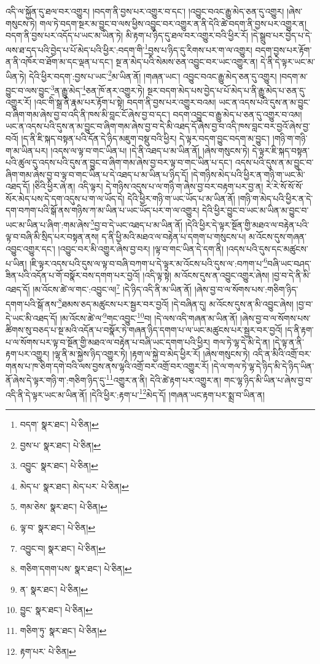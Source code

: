འདི་ལ་སྐྱོན་དུ་ཐལ་བར་འགྱུར། །བདག་ནི་བྱས་པར་འགྱུར་བ་དང་། །འབྱུང་བའང་རྒྱུ་མེད་ཅན་དུ་འགྱུར། །ཞེས་གསུངས་ཏེ། གལ་ཏེ་བདག་སྔར་མ་བྱུང་བ་ལས་ཕྱིས་འབྱུང་བར་འགྱུར་ན་ནི་དེའི་ཚེ་བདག་ནི་བྱས་པར་འགྱུར་ན། བདག་ནི་བྱས་པར་འདོད་པ་ཡང་མ་ཡིན་ཏེ། མི་རྟག་པ་ཉིད་དུ་ཐལ་བར་འགྱུར་བའི་ཕྱིར་རོ། །དེ་སྒྲུབ་པར་བྱེད་པ་དེ་ལས་ཐ་དད་པའི་བྱེད་པ་པོ་མེད་པའི་ཕྱིར་:བདག་གི་\footnote{བདག་  སྣར་ཐང་།  པེ་ཅིན། }བྱས་པ་ཉིད་དུ་རིགས་པར་ག་ལ་འགྱུར། བདག་བྱས་པར་རྟོག་ན་ནི་འཁོར་བ་ཐོག་མ་དང་ལྡན་པ་དང་། སྔ་ན་མེད་པའི་སེམས་ཅན་འབྱུང་བར་ཡང་འགྱུར་ན། དེ་ནི་དེ་ལྟར་ཡང་མ་ཡིན་ཏེ། དེའི་ཕྱིར་བདག་:བྱས་པ་ཡང་\footnote{བྱས་པ་  སྣར་ཐང་།  པེ་ཅིན། }མ་ཡིན་ནོ། །གཞན་ཡང་། འབྱུང་བའང་རྒྱུ་མེད་ཅན་དུ་འགྱུར། །བདག་མ་བྱུང་བ་ལས་བྱུང་\footnote{འབྱུང་  སྣར་ཐང་།  པེ་ཅིན། }ན་རྒྱུ་མེད་\footnote{མེད་པ་  སྣར་ཐང་། མེད་པར་  པེ་ཅིན། }ཅན་ཁོ་ནར་འགྱུར་ཏེ། སྔར་བདག་མེད་པས་བྱེད་པ་པོ་མེད་པ་ནི་རྒྱུ་མེད་པ་ཅན་དུ་འགྱུར་རོ། །འང་གི་སྒྲ་ནི་རྣམ་པར་རྟོག་པ་སྟེ། བདག་ནི་བྱས་པར་འགྱུར་བའམ། ཡང་ན་འདས་པའི་དུས་ན་མ་བྱུང་བ་ཞིག་གམ་ཞེས་བྱ་བ་འདི་ནི་ཁས་མི་བླང་ངོ་ཞེས་བྱ་བ་དང་། བདག་འབྱུང་བ་རྒྱུ་མེད་པ་ཅན་དུ་འགྱུར་བ་འམ། ཡང་ན་འདས་པའི་དུས་ན་མ་བྱུང་བ་ཞིག་གམ་ཞེས་བྱ་བ་དེ་མི་འཐད་དོ་ཞེས་བྱ་བ་འདི་ཁས་བླང་བར་བྱའོ་ཞེས་བྱ་བའོ། །ད་ནི་ཇི་སྐད་བསྟན་པའི་དོན་དེ་ཉིད་མཇུག་བསྡུ་བའི་ཕྱིར། དེ་ལྟར་བདག་བྱུང་བདག་མ་བྱུང་། །གཉི་ག་གཉི་ག་མ་ཡིན་པར། །འདས་ལ་ལྟ་བ་གང་ཡིན་པ། །དེ་ནི་འཐད་པ་མ་ཡིན་ནོ། །ཞེས་གསུངས་ཏེ། དེ་ལྟར་ཇི་སྐད་བསྟན་པའི་ཚུལ་དུ་འདས་པའི་དུས་ན་བྱུང་བ་ཞིག་གམ་ཞེས་བྱ་བར་ལྟ་བ་གང་ཡིན་པ་དང་། འདས་པའི་དུས་ན་མ་བྱུང་བ་ཞིག་གམ་ཞེས་བྱ་བ་ལྟ་བ་གང་ཡིན་པ་དེ་འཐད་པ་མ་ཡིན་པ་ཉིད་དོ། །དེ་གཉིས་མེད་པའི་ཕྱིར་ན་གཉི་ག་ཡང་མི་འཐད་དོ། །ཅིའི་ཕྱིར་ཞེ་ན། འདི་ལྟར། དེ་གཉིས་འདུས་པ་ལ་གཉི་ག་ཞེས་བྱ་བར་བརྟག་པར་བྱ་ན། རེ་རེ་སོ་སོ་སོ་སོར་མེད་པས་དེ་དག་འདུས་པ་ག་ལ་ཡོད་དེ། དེའི་ཕྱིར་གཉི་ག་ཡང་ཡོད་པ་མ་ཡིན་ནོ། །གཉི་ག་མེད་པའི་ཕྱིར་ན་དེ་དག་བཀག་པའི་སྒོ་ནས་གཉིས་ཀ་མ་ཡིན་པ་ཡང་ཡོད་པར་ག་ལ་འགྱུར། དེའི་ཕྱིར་བྱུང་བ་ཡང་མ་ཡིན་མ་བྱུང་བ་ཡང་མ་ཡིན་པ་ཞིག་:གམ་ཞེས་\footnote{གམ་ཅེས་  སྣར་ཐང་།  པེ་ཅིན། }བྱ་བ་དེ་ཡང་འཐད་པ་མ་ཡིན་ནོ། །དེའི་ཕྱིར་དེ་ལྟར་སྔོན་གྱི་མཐའ་ལ་བརྟེན་པའི་ལྟ་བ་བཞི་མི་སྲིད་པར་བསྟན་ནས། ད་ནི་ཕྱི་མའི་མཐའ་ལ་བརྟེན་པ་དགག་པ་གསུངས་པ། མ་འོངས་དུས་གཞན་འབྱུང་འགྱུར་དང་། །འབྱུང་བར་མི་འགྱུར་ཞེས་བྱ་བར། །ལྟ་བ་གང་ཡིན་དེ་དག་ནི། །འདས་པའི་དུས་དང་མཚུངས་པ་ཡིན། །ཇི་ལྟར་འདས་པའི་དུས་ལ་ལྟ་བ་བཞི་བཀག་པ་དེ་ལྟར་མ་འོངས་པའི་དུས་ལ་:བཀག་པ་\footnote{ལྟ་བ་  སྣར་ཐང་།  པེ་ཅིན། }བཞི་ཡང་བཤད་ཟིན་པའི་འདོན་པ་གོ་བསྣོར་བས་དགག་པར་བྱའོ། །འདི་ལྟ་སྟེ། མ་འོངས་དུས་ན་འབྱུང་འགྱུར་ཞེས། །བྱ་བ་དེ་ནི་མི་འཐད་དོ། །མ་འོངས་ཚེ་ལ་གང་:འབྱུང་ལ།\footnote{འབྱུང་བ།  སྣར་ཐང་།  པེ་ཅིན། } །དེ་ཉིད་འདི་ནི་མ་ཡིན་ནོ། །ཞེས་བྱ་བ་ལ་སོགས་པས་:གཅིག་ཉིད་དགག་པའི་སྒོ་ནས་\footnote{གཅིག་དགག་པས་  སྣར་ཐང་།  པེ་ཅིན། }ཐམས་ཅད་མཚུངས་པར་སྦྱར་བར་བྱའོ། །དེ་བཞིན་དུ། མ་འོངས་དུས་ན་མི་འབྱུང་ཞེས། །བྱ་བ་དེ་ཡང་མི་འཐད་དོ། །མ་འོངས་ཚེ་ལ་\footnote{ན་  སྣར་ཐང་།  པེ་ཅིན། }གང་འབྱུང་\footnote{བྱུང་  སྣར་ཐང་།  པེ་ཅིན། }བ། །དེ་ལས་འདི་གཞན་མ་ཡིན་ནོ། །ཞེས་བྱ་བ་ལ་སོགས་པས་ཚིགས་སུ་བཅད་པ་སྔ་མའི་འདོན་པ་བསྣོར་ཏེ་གཞན་ཉིད་དགག་པ་ལ་ཡང་མཚུངས་པར་སྦྱར་བར་བྱའོ། །ད་ནི་རྟག་པ་ལ་སོགས་པར་ལྟ་བ་སྔོན་གྱི་མཐའ་ལ་བརྟེན་པ་བཞི་ཡང་དགག་པའི་ཕྱིར། གལ་ཏེ་ལྷ་དེ་མི་དེ་ན། །དེ་ལྟ་ན་ནི་རྟག་པར་འགྱུར། །ལྷ་ནི་མ་སྐྱེས་ཉིད་འགྱུར་ཏེ། །རྟག་ལ་སྐྱེ་བ་མེད་ཕྱིར་རོ། །ཞེས་གསུངས་ཏེ། འདི་ན་མིའི་འགྲོ་བར་གནས་པ་ཁ་ཅིག་དགེ་བའི་ལས་བྱས་ནས་ལྷའི་འགྲོ་བར་འགྲོ་བར་འགྱུར་རོ། །དེ་ལ་གལ་ཏེ་ལྷ་དེ་ཉིད་མི་དེ་ཉིད་ཡིན་ནོ་ཞེས་དེ་ལྟར་གཉི་ག་:གཅིག་ཉིད་དུ་\footnote{གཅིག་ཏུ་  སྣར་ཐང་།  པེ་ཅིན། }འགྱུར་ན་ནི། དེའི་ཚེ་རྟག་པར་འགྱུར་ན། གང་ལྷ་ཉིད་མི་ཡིན་པ་ཞེས་བྱ་བ་འདི་ནི་དེ་ལྟར་ཡང་མ་ཡིན་ནོ། །དེའི་ཕྱིར་:རྟག་པ་\footnote{རྟག་པར་  པེ་ཅིན། }མེད་དོ། །གཞན་ཡང་རྟག་པར་སྨྲ་བ་ཡིན་ན། 
